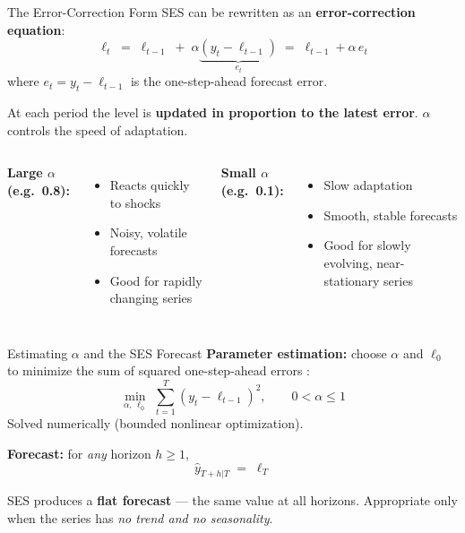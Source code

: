 \documentclass[aspectratio=169, 11pt]{beamer}
\begin{document}
\begin{frame}{The Error-Correction Form}
  SES can be rewritten as an \textbf{error-correction equation}:
  \[
    \ell_t \;=\; \ell_{t-1} \;+\; \alpha\underbrace{(y_t - \ell_{t-1})}_{e_t}
           \;=\; \ell_{t-1} + \alpha\,e_t
  \]
  where $e_t = y_t - \ell_{t-1}$ is the one-step-ahead forecast error.
  \begin{keybox}
    At each period the level is \textbf{updated in proportion to the latest
    error}. $\alpha$ controls the speed of adaptation.
  \end{keybox}
  \begin{columns}[T]
      \textbf{Large $\alpha$ (e.g.\ 0.8):}
      \begin{itemize}\small
        \item Reacts quickly to shocks
        \item Noisy, volatile forecasts
        \item Good for rapidly changing series
      \end{itemize}
      \textbf{Small $\alpha$ (e.g.\ 0.1):}
      \begin{itemize}\small
        \item Slow adaptation
        \item Smooth, stable forecasts
        \item Good for slowly evolving, near-stationary series
      \end{itemize}
  \end{columns}
\end{frame}

\begin{frame}{Estimating $\alpha$ and the SES Forecast}
  \textbf{Parameter estimation:} choose $\alpha$ and $\ell_0$ to minimize
  the sum of squared one-step-ahead errors \parencite[][Ch.~8]{Hyndman2021}:
  \[
    \min_{\alpha,\,\ell_0}\;\sum_{t=1}^{T}(y_t - \ell_{t-1})^2,
    \qquad 0 < \alpha \leq 1
  \]
  Solved numerically (bounded nonlinear optimization).

  \vspace{0.15cm}
  \textbf{Forecast:} for \emph{any} horizon $h \geq 1$,
  \[
    \hat{y}_{T+h|T} \;=\; \ell_T
  \]
  \begin{warningbox}
    SES produces a \textbf{flat forecast} --- the same value at all horizons.
    Appropriate only when the series has \emph{no trend and no seasonality}.
  \end{warningbox}
\end{frame}
\end{document}
